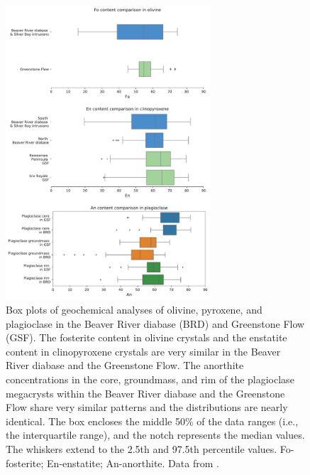  \begin{figure}[h!]
\centering
\noindent\includegraphics[width=0.68\textwidth]{figure/Zhang2021/Geochem.pdf}
\caption{\footnotesize{Box plots of geochemical analyses of olivine, pyroxene, and plagioclase in the Beaver River diabase (BRD) and Greenstone Flow (GSF). The fosterite content in olivine crystals and the enstatite content in clinopyroxene crystals are very similar in the Beaver River diabase and the Greenstone Flow. The anorthite concentrations in the core, groundmass, and rim of the plagioclase megacrysts within the Beaver River diabase and the Greenstone Flow share very similar patterns and the distributions are nearly identical. The box encloses the middle 50\% of the data ranges (i.e., the interquartile range), and the notch represents the median values. The whiskers extend to the 2.5th and 97.5th percentile values. Fo-fosterite; En-enstatite; An-anorthite. Data from \cite{Doyle2016a}.}}
\label{fig:Geochem}
\end{figure}

